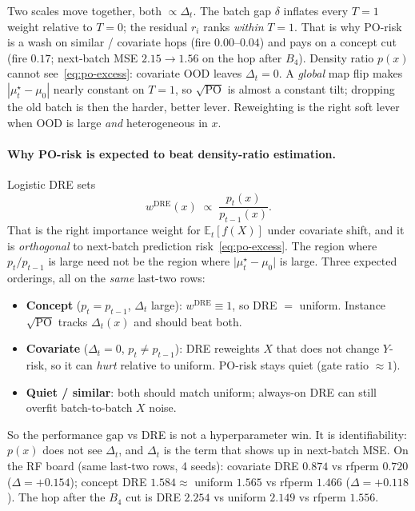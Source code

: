 Two scales move together, both $\propto\Delta_t$. The batch gap
$\delta$ inflates every $T{=}1$ weight relative to $T{=}0$; the residual
$r_i$ ranks \emph{within} $T{=}1$. That is why PO-risk is a wash on
similar / covariate hops (fire $0.00$--$0.04$) and pays on a concept
cut (fire $0.17$; next-batch MSE $2.15\to 1.56$ on the hop after $B_4$).
Density ratio $p(x)$ cannot see~\eqref{eq:po-excess}: covariate OOD
leaves $\Delta_t=0$. A \emph{global} map flip makes
$|\mu_t^\star-\mu_0|$ nearly constant on $T{=}1$, so $\sqrt{\mathrm{PO}}$
is almost a constant tilt; dropping the old batch is then the harder,
better lever. Reweighting is the right soft lever when OOD is large
\emph{and} heterogeneous in $x$.

\paragraph{Why PO-risk is expected to beat density-ratio estimation.}
Logistic DRE sets
\begin{equation}
  w^{\mathrm{DRE}}(x)
    \;\propto\;
    \frac{p_t(x)}{p_{t-1}(x)}.
\end{equation}
That is the right importance weight for $\mathbb{E}_t[f(X)]$ under
covariate shift, and it is \emph{orthogonal} to next-batch prediction
risk~\eqref{eq:po-excess}. The region where $p_t/p_{t-1}$ is large need
not be the region where $\lvert\mu_t^\star-\mu_0\rvert$ is large.
Three expected orderings, all on the \emph{same} last-two rows:
\begin{itemize}
  \item \textbf{Concept} ($p_t=p_{t-1}$, $\Delta_t$ large):
    $w^{\mathrm{DRE}}\equiv 1$, so DRE $=$ uniform. Instance
    $\sqrt{\mathrm{PO}}$ tracks $\Delta_t(x)$ and should beat both.
  \item \textbf{Covariate} ($\Delta_t=0$, $p_t\neq p_{t-1}$):
    DRE reweights $X$ that does not change $Y$-risk, so it can
    \emph{hurt} relative to uniform. PO-risk stays quiet
    (gate ratio $\approx 1$).
  \item \textbf{Quiet / similar}: both should match uniform; always-on
    DRE can still overfit batch-to-batch $X$ noise.
\end{itemize}
So the performance gap vs DRE is not a hyperparameter win. It is
identifiability: $p(x)$ does not see $\Delta_t$, and $\Delta_t$ is the
term that shows up in next-batch MSE. On the RF board (same last-two
rows, 4 seeds): covariate DRE $0.874$ vs rfperm $0.720$
($\Delta=+0.154$); concept DRE $1.584\approx$ uniform $1.565$ vs
rfperm $1.466$ ($\Delta=+0.118$). The hop after the $B_4$ cut is
DRE $2.254$ vs uniform $2.149$ vs rfperm $1.556$.

